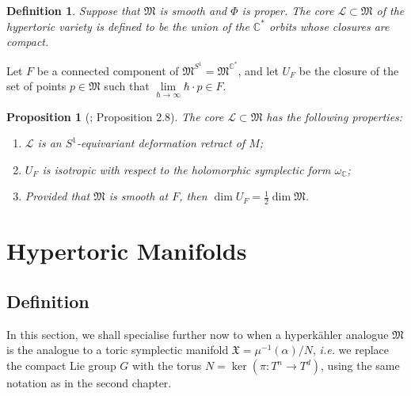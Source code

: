 \documentclass{article}
\newtheorem{prop}[theorem]{Proposition}
\newtheorem{defn}[theorem]{Definition\rm}
\newcommand{\ie}{\emph{i.e.} }
\newcommand{\w}{\omega}
\newcommand{\HK}{hyperk\"ahler }
\newcommand{\CC}{\mathbb{C}}
\newcommand{\mc}[1]{\mathcal{#1}}
\newcommand{\mf}[1]{\mathfrak{#1}}
\begin{document}
	\begin{defn}
		Suppose that $\mf{M}$ is smooth and $\Phi$ is proper. The \emph{core} $\mc{L} \subset \mf{M}$ of the hypertoric variety is defined to be the union of the $\CC^{\ast}$ orbits whose closures are compact.
	\end{defn}
	
	Let $F$ be a connected component of $\mf{M}^{S^{1}} =  \mf{M}^{\CC^{\ast}}$, and let $U_{F}$ be the closure of the set of points $p \in \mf{M}$ such that $\lim\limits_{\hbar \rightarrow \infty} \hbar \cdot p \in F$.
	
	\begin{prop}[\cite{proudfoot2004hyperkahler}; Proposition 2.8]
		The core $\mc{L} \subset \mf{M}$ has the following properties:
		\begin{enumerate}
			\item $\mc{L}$ is an $S^{1}$-equivariant deformation retract of $M$;
			\item $U_{F}$ is isotropic with respect to the holomorphic symplectic form $\w_{\CC}$;
			\item Provided that $\mf{M}$ is smooth at $F$, then $\dim U_{F} = \tfrac{1}{2}\dim \mf{M}$.
		\end{enumerate}
	\end{prop}
	
	\section{Hypertoric Manifolds}
	
	\subsection{Definition}
	
	In this section, we shall specialise further now to when a \HK analogue $\mf{M}$ is the analogue to a toric symplectic manifold $\mf{X} = \mu^{-1}(\alpha)/N$, \ie we replace the compact Lie group $G$ with the torus $N = \ker(\pi:T^{n} \rightarrow T^{d})$, using the same notation as in the second chapter. 
	
\end{document}
